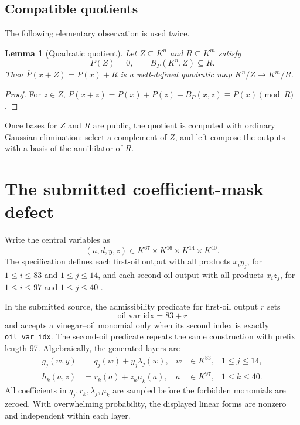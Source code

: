 \documentclass[11pt]{article}
\newtheorem{lemma}[theorem]{Lemma}
\newcommand{\code}[1]{\texttt{#1}}
\begin{document}
\subsection{Compatible quotients}

The following elementary observation is used twice.

\begin{lemma}[Quadratic quotient]
Let $Z\subseteq K^n$ and $R\subseteq K^m$ satisfy
\[
        P(Z)=0,\qquad B_P(K^n,Z)\subseteq R.
\]
Then $\overline P(x+Z)=P(x)+R$ is a well-defined quadratic map
$K^n/Z\to K^m/R$.
\end{lemma}

\begin{proof}
For $z\in Z$,
$P(x+z)=P(x)+P(z)+B_P(x,z)\equiv P(x)\pmod R$.
\end{proof}

Once bases for $Z$ and $R$ are public, the quotient is computed with ordinary
Gaussian elimination: select a complement of $Z$, and left-compose the
outputs with a basis of the annihilator of $R$.

\section{The submitted coefficient-mask defect}

Write the central variables as
\[
     (u,d,y,z)\in K^{67}\times K^{16}\times K^{14}\times K^{40}.
\]
The specification defines each first-oil output with all products
$x_i y_j$, for $1\leq i\leq83$ and $1\leq j\leq14$, and each second-oil
output with all products $x_i z_j$, for $1\leq i\leq97$ and
$1\leq j\leq40$ \cite{vdoo-spec}.

In the submitted source, the admissibility predicate for first-oil output
$r$ sets
\[
       \text{oil\_var\_idx}=83+r
\]
and accepts a vinegar--oil monomial only when its second index is exactly
\code{oil\_var\_idx}.  The second-oil predicate repeats the same construction
with prefix length 97.  Algebraically, the generated layers are
\begin{align}
 g_j(w,y)&=q_j(w)+y_j\lambda_j(w),
     &w&\in K^{83}, &1\leq j\leq14, \label{eq:o1}\\
 h_k(a,z)&=r_k(a)+z_k\mu_k(a),
     &a&\in K^{97}, &1\leq k\leq40. \label{eq:o2}
\end{align}
All coefficients in $q_j,r_k,\lambda_j,\mu_k$ are sampled before the
forbidden monomials are zeroed.  With overwhelming probability, the displayed
linear forms are nonzero and independent within each layer.
\end{document}
